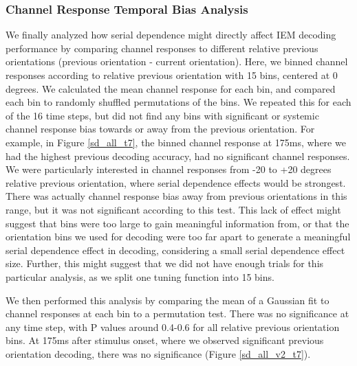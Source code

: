 \documentclass[../main.tex]{subfiles}
\begin{document}
\subsubsection*{Channel Response Temporal Bias Analysis}
We finally analyzed how serial dependence might directly affect IEM decoding performance by comparing channel responses to different relative previous orientations (previous orientation - current orientation). Here, we binned channel responses according to relative previous orientation with 15 bins, centered at 0 degrees. We calculated the mean channel response for each bin, and compared each bin to randomly shuffled permutations of the bins. We repeated this for each of the 16 time steps, but did not find any bins with significant or systemic channel response bias towards or away from the previous orientation. For example, in Figure \ref{sd_all_t7}, the binned channel response at 175ms, where we had the highest previous decoding accuracy, had no significant channel responses. We were particularly interested in channel responses from -20 to +20 degrees relative previous orientation, where serial dependence effects would be strongest. There was actually channel response bias away from previous orientations in this range, but it was not significant according to this test. This lack of effect might suggest that bins were too large to gain meaningful information from, or that the orientation bins we used for decoding were too far apart to generate a meaningful serial dependence effect in decoding, considering a small serial dependence effect size. Further, this might suggest that we did not have enough trials for this particular analysis, as we split one tuning function into 15 bins.

We then performed this analysis by comparing the mean of a Gaussian fit to channel responses at each bin to a permutation test. There was no significance at any time step, with P values around 0.4-0.6 for all relative previous orientation bins. At 175ms after stimulus onset, where we observed significant previous orientation decoding, there was no significance (Figure \ref{sd_all_v2_t7}).
\end{document}
